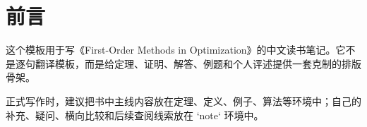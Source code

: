 \chapter*{前言}

这个模板用于写《First-Order Methods in Optimization》的中文读书笔记。它不是逐句翻译模板，而是给定理、证明、解答、例题和个人评述提供一套克制的排版骨架。

正式写作时，建议把书中主线内容放在定理、定义、例子、算法等环境中；自己的补充、疑问、横向比较和后续查阅线索放在 `note` 环境中。
